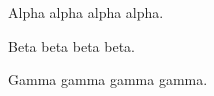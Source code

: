 \documentclass[11pt]{article}
\begin{document}
Alpha alpha alpha alpha.

\vspace{6pt}
Beta beta beta beta.

\vspace{6pt}
Gamma gamma gamma gamma.
\end{document}
